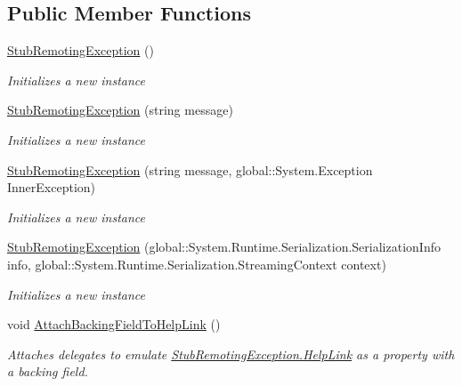 \subsection*{Public Member Functions}
\begin{DoxyCompactItemize}
\item 
\hyperlink{class_system_1_1_runtime_1_1_remoting_1_1_fakes_1_1_stub_remoting_exception_a7f2d3d1a48d4f2cff6e96424bdb18007}{Stub\-Remoting\-Exception} ()
\begin{DoxyCompactList}\small\item\em Initializes a new instance\end{DoxyCompactList}\item 
\hyperlink{class_system_1_1_runtime_1_1_remoting_1_1_fakes_1_1_stub_remoting_exception_a4921c9d55081ffdc2f9058f8fec980d8}{Stub\-Remoting\-Exception} (string message)
\begin{DoxyCompactList}\small\item\em Initializes a new instance\end{DoxyCompactList}\item 
\hyperlink{class_system_1_1_runtime_1_1_remoting_1_1_fakes_1_1_stub_remoting_exception_affe57885309cb6478cbf380febc796a7}{Stub\-Remoting\-Exception} (string message, global\-::\-System.\-Exception Inner\-Exception)
\begin{DoxyCompactList}\small\item\em Initializes a new instance\end{DoxyCompactList}\item 
\hyperlink{class_system_1_1_runtime_1_1_remoting_1_1_fakes_1_1_stub_remoting_exception_a754862eef10fdf2072f256708f53462e}{Stub\-Remoting\-Exception} (global\-::\-System.\-Runtime.\-Serialization.\-Serialization\-Info info, global\-::\-System.\-Runtime.\-Serialization.\-Streaming\-Context context)
\begin{DoxyCompactList}\small\item\em Initializes a new instance\end{DoxyCompactList}\item 
void \hyperlink{class_system_1_1_runtime_1_1_remoting_1_1_fakes_1_1_stub_remoting_exception_a71f776d81c8f1efad8837b547e34c0c1}{Attach\-Backing\-Field\-To\-Help\-Link} ()
\begin{DoxyCompactList}\small\item\em Attaches delegates to emulate \hyperlink{class_system_1_1_runtime_1_1_remoting_1_1_fakes_1_1_stub_remoting_exception_ada6313f80ccf795149569dd0faf8adb7}{Stub\-Remoting\-Exception.\-Help\-Link} as a property with a backing field.\end{DoxyCompactList}\item 

\end{DoxyCompactItemize}
